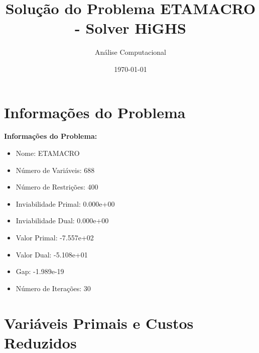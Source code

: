 \documentclass[12pt]{article}
\title{Solução do Problema ETAMACRO - Solver HiGHS}
\author{Análise Computacional}
\date{\today}
\begin{document}
\maketitle

\section{Informações do Problema}

\textbf{Informações do Problema:}
\begin{itemize}
\item Nome: ETAMACRO
\item Número de Variáveis: 688
\item Número de Restrições: 400
\item Inviabilidade Primal: 0.000e+00
\item Inviabilidade Dual: 0.000e+00
\item Valor Primal: -7.557e+02
\item Valor Dual: -5.108e+01
\item Gap: -1.989e-19
\item Número de Iterações: 30
\end{itemize}


\section{Variáveis Primais e Custos Reduzidos}
\end{document}
